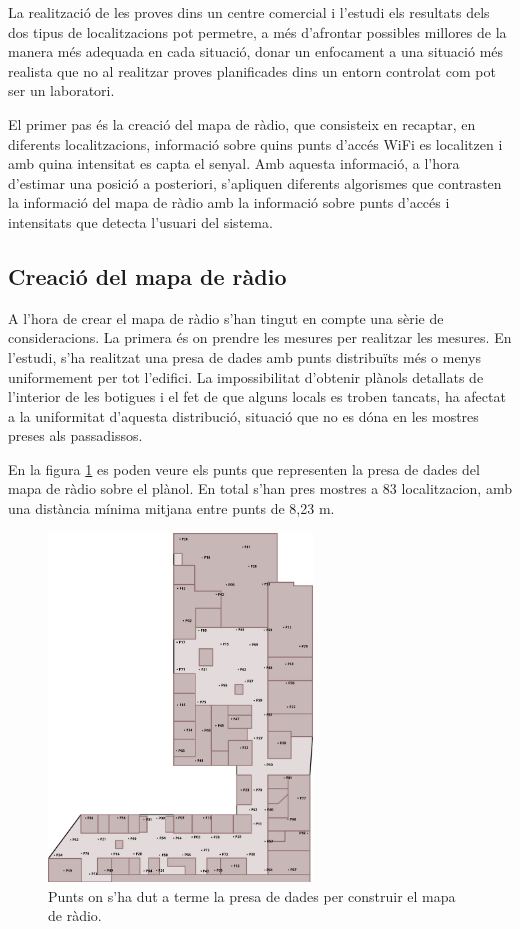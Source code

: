 La realització de les proves dins un centre comercial i l'estudi els resultats dels dos tipus de localitzacions pot permetre, a més d'afrontar possibles millores de la manera més adequada en cada situació, donar un enfocament a una situació més realista que no al realitzar proves planificades dins un entorn controlat com pot ser un laboratori.

El primer pas és la creació del mapa de ràdio, que consisteix en recaptar, en diferents localitzacions, informació sobre quins punts d'accés WiFi es localitzen i amb quina intensitat es capta el senyal. Amb aquesta informació, a l'hora d'estimar una posició a posteriori, s'apliquen diferents algorismes que contrasten la informació del mapa de ràdio amb la informació sobre punts d'accés i intensitats que detecta l'usuari del sistema.

\subsection{Creació del mapa de ràdio}

A l'hora de crear el mapa de ràdio s'han tingut en compte una sèrie de consideracions. La primera és on prendre les mesures per realitzar les mesures. En l'estudi, s'ha realitzat una presa de dades amb punts distribuïts més o menys uniformement per tot l'edifici. La impossibilitat d'obtenir plànols detallats de l'interior de les botigues i el fet de que alguns locals es troben tancats, ha afectat a la uniformitat d'aquesta distribució, situació que no es dóna en les mostres preses als passadissos.

En la figura \ref{fig:planol_log} es poden veure els punts que representen la presa de dades del mapa de ràdio sobre el plànol. En total s'han pres mostres a 83 localitzacion, amb una distància mínima mitjana entre punts de 8,23 m.

\begin{figure}[ht]
\begin{center}
\includegraphics[width=7cm]{imatges/planol_log.png}
\caption{Punts on s'ha dut a terme la presa de dades per construir el mapa de ràdio.}
\label{fig:planol_log}
\end{center}
\end{figure}

